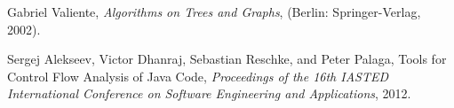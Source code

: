 
%
%
%
\begin{thebibliography}{1}

Gabriel Valiente, {\em Algorithms on Trees and Graphs}, (Berlin: Springer-Verlag, 2002). %
  
Sergej Alekseev, Victor Dhanraj, Sebastian Reschke, and Peter Palaga,
Tools for Control Flow Analysis of Java Code, {\it Proceedings of the 16th IASTED International Conference on Software Engineering and Applications}, 2012.

\end{thebibliography}